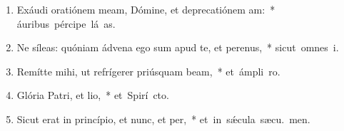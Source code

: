 \begin{flushleft}
\begin{enumerate}[leftmargin=*]
\item Exáudi oratiónem meam, Dómine, et deprecatiónem am:~* \mbox{áuribus pércipe lá as.}
\item Ne síleas: quóniam ádvena ego sum apud te, et perenus,~* \mbox{sicut omnes  i.}
\item Remítte mihi, ut refrígerer priúsquam beam,~* \mbox{et ámpli  ro.}
\item Glória Patri, et lio,~* \mbox{et Spirí cto.}
\item Sicut erat in princípio, et nunc, et per,~* \mbox{et in s\'{\ae}cula sæcu. men.}

\end{enumerate}
\end{flushleft}

